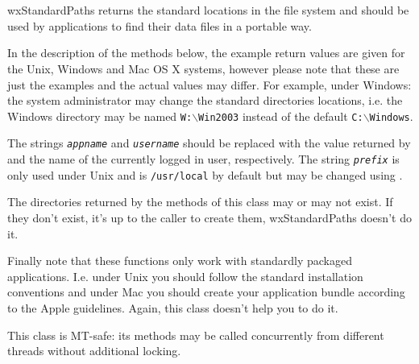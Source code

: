 
\section{}\label{wxstandardpaths}

wxStandardPaths returns the standard locations in the file system and should be
used by applications to find their data files in a portable way.

In the description of the methods below, the example return values are given
for the Unix, Windows and Mac OS X systems, however please note that these are
just the examples and the actual values may differ. For example, under Windows:
the system administrator may change the standard directories locations, i.e.
the Windows directory may be named \texttt{W:$\backslash$Win2003} instead of
the default \texttt{C:$\backslash$Windows}.

The strings \texttt{\textit{appname}} and \texttt{\textit{username}} should be
replaced with the value returned by  
and the name of the currently logged in user, respectively. The string 
\texttt{\textit{prefix}} is only used under Unix and is \texttt{/usr/local} by
default but may be changed using .

The directories returned by the methods of this class may or may not exist. If
they don't exist, it's up to the caller to create them, wxStandardPaths doesn't
do it.

Finally note that these functions only work with standardly packaged
applications. I.e. under Unix you should follow the standard installation
conventions and under Mac you should create your application bundle according
to the Apple guidelines. Again, this class doesn't help you to do it.

This class is MT-safe: its methods may be called concurrently from different
threads without additional locking.


